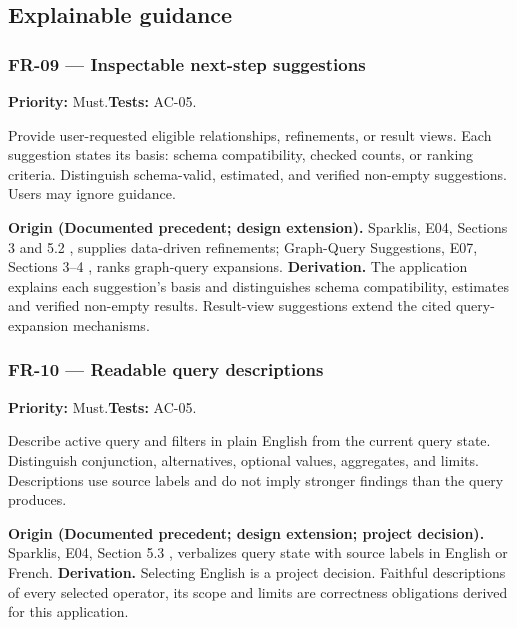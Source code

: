 \documentclass[11pt,a4paper]{article}
\newcommand{\req}[4]{\subsubsection*{#1 --- #2}\phantomsection\label{req:#1}\textbf{Priority:} #3.\quad\textbf{Tests:} #4.\par}
\newcommand{\origin}[3]{\par{\small\textbf{Origin (#1).} #2 \textbf{Derivation.} #3\par}}
\begin{document}
\subsection{Explainable guidance}
\par\noindent\begin{minipage}{\linewidth}
\req{FR-09}{Inspectable next-step suggestions}{Must}{AC-05}
Provide user-requested eligible relationships, refinements, or result views. Each suggestion states its basis: schema compatibility, checked counts, or ranking criteria. Distinguish schema-valid, estimated, and verified non-empty suggestions. Users may ignore guidance.
\origin{Documented precedent; design extension}{Sparklis, E04, Sections 3 and 5.2 \citep{sparklis}, supplies data-driven refinements; Graph-Query Suggestions, E07, Sections 3--4 \citep{suggestions}, ranks graph-query expansions.}{The application explains each suggestion's basis and distinguishes schema compatibility, estimates and verified non-empty results. Result-view suggestions extend the cited query-expansion mechanisms.}
\end{minipage}\par
\par\noindent\begin{minipage}{\linewidth}
\req{FR-10}{Readable query descriptions}{Must}{AC-05}
Describe active query and filters in plain English from the current query state. Distinguish conjunction, alternatives, optional values, aggregates, and limits. Descriptions use source labels and do not imply stronger findings than the query produces.
\origin{Documented precedent; design extension; project decision}{Sparklis, E04, Section 5.3 \citep{sparklis}, verbalizes query state with source labels in English or French.}{Selecting English is a project decision. Faithful descriptions of every selected operator, its scope and limits are correctness obligations derived for this application.}
\end{minipage}\par
\end{document}
